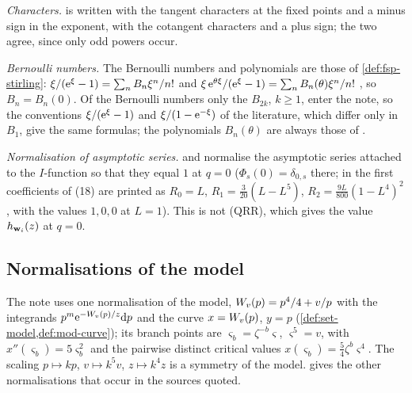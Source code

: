 \emph{Characters.} \cite[\S2.2, Theorem~1]{Giv01} is written with the tangent characters at the fixed points and a minus sign in the exponent, \cite[9.1~Theorem]{MR1901075} with the cotangent characters and a plus sign; the two agree, since only odd powers occur.

\emph{Bernoulli numbers.} The Bernoulli numbers and polynomials are those of \cref{def:fsp-stirling}: $\xi/(\mathrm{e}^\xi-1)=\sum_nB_n\xi^n/n!$ and $\xi\,\mathrm{e}^{\theta\xi}/(\mathrm{e}^\xi-1)=\sum_nB_n(\theta)\xi^n/n!$ \cite[24.2.3]{DLMF}, so $B_n=B_n(0)$. Of the Bernoulli numbers only the $B_{2k}$, $k\geq1$, enter the note, so the conventions $\xi/(\mathrm{e}^\xi-1)$ and $\xi/(1-\mathrm{e}^{-\xi})$ of the literature, which differ only in $B_1$, give the same formulas; the polynomials $B_n(\theta)$ are always those of \cite[24.2.3]{DLMF}.

\emph{Normalisation of asymptotic series.} \cite[Theorem~4 (i)]{ZZ08} and \cite[\S2.4.4, (18)]{LP20} normalise the asymptotic series attached to the $I$-function so that they equal $1$ at $q=0$ ($\Phi_s(0)=\delta_{0,s}$ there; in \cite[\S2.4.4]{LP20} the first coefficients of (18) are printed as $R_0=L$, $R_1=\frac3{20}(L-L^5)$, $R_2=\frac{9L}{800}(1-L^4)^2$, with the values $1,0,0$ at $L=1$). This is not (QRR), which gives the value $h_{\mathbf{w}_i}(z)$ at $q=0$.

\subsection{Normalisations of the model}
\label{sec:sgn-model}

The note uses one normalisation of the model, $W_{v}(p)=p^4/4+v/p$ with the integrands $p^m\mathrm{e}^{-W_{v}(p)/z}\mathrm{d} p$ and the curve $x=W_{v}(p)$, $y=p$ (\cref{def:set-model,def:mod-curve}); its branch points are $\varsigma_b=\zeta^{-b}\varsigma$, $\varsigma^5=v$, with $x''(\varsigma_b)=5\varsigma_b^2$ and the pairwise distinct critical values $x(\varsigma_b)=\frac54\zeta^b\varsigma^4$. The scaling $p\mapsto kp$, $v\mapsto k^5v$, $z\mapsto k^4z$ is a symmetry of the model.  gives the other normalisations that occur in the sources quoted.

